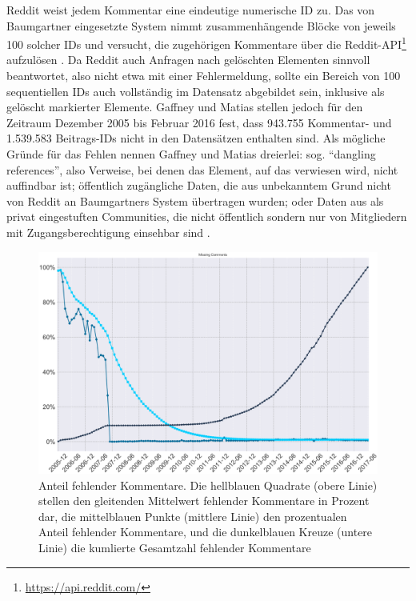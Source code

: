 \documentclass[11pt,a4paper,twoside]{article}
\let\rmarkdownfootnote\footnote%
\def\footnote{\protect\rmarkdownfootnote}
\begin{document}
Reddit weist jedem Kommentar eine eindeutige numerische ID zu. Das von
Baumgartner eingesetzte System nimmt zusammenhängende Blöcke von jeweils
100 solcher IDs und versucht, die zugehörigen Kommentare über die
Reddit-API\footnote{\url{https://api.reddit.com/}} aufzulösen
\autocite{Baumgartner2018a}. Da Reddit auch Anfragen nach gelöschten
Elementen sinnvoll beantwortet, also nicht etwa mit einer Fehlermeldung,
sollte ein Bereich von 100 sequentiellen IDs auch vollständig im
Datensatz abgebildet sein, inklusive als gelöscht markierter Elemente.
Gaffney und Matias stellen jedoch für den Zeitraum Dezember 2005 bis
Februar 2016 fest, dass 943.755 Kommentar- und 1.539.583 Beitrags-IDs
nicht in den Datensätzen enthalten sind. Als mögliche Gründe für das
Fehlen nennen Gaffney und Matias dreierlei: sog. \enquote{dangling
references}, also Verweise, bei denen das Element, auf das verwiesen
wird, nicht auffindbar ist; öffentlich zugängliche Daten, die aus
unbekanntem Grund nicht von Reddit an Baumgartners System übertragen
wurden; oder Daten aus als privat eingestuften Communities, die nicht
öffentlich sondern nur von Mitgliedern mit Zugangsberechtigung einsehbar
sind \autocite{Gaffney2018}.







\begin{figure}

{\centering \includegraphics[width=0.8\linewidth]{./images/gaffneymatias_fig4} 

}

\caption{Anteil fehlender Kommentare. Die hellblauen Quadrate (obere
Linie) stellen den gleitenden Mittelwert fehlender Kommentare in Prozent
dar, die mittelblauen Punkte (mittlere Linie) den prozentualen Anteil
fehlender Kommentare, und die dunkelblauen Kreuze (untere Linie) die
kumlierte Gesamtzahl fehlender Kommentare \autocite{Gaffney2018}}\label{fig:gf4}
\end{figure}
\end{document}
